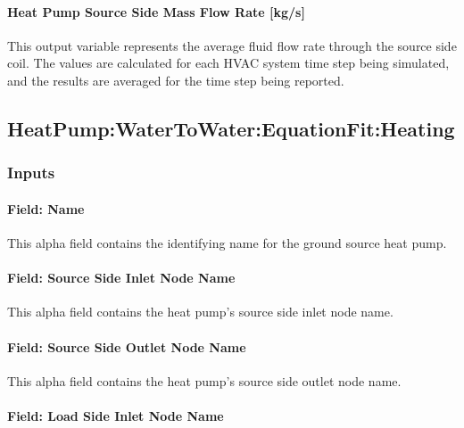 \paragraph{Heat Pump Source Side Mass Flow Rate {[}kg/s{]}}\label{water-to-water-heat-pump-source-side-mass-flow-rate-kgs}

This output variable represents the average fluid flow rate through the source side coil. The values are calculated for each HVAC system time step being simulated, and the results are averaged for the time step being reported.

\subsection{HeatPump:WaterToWater:EquationFit:Heating}\label{heatpumpwatertowaterequationfitheating}

\subsubsection{Inputs}\label{inputs-13-010}

\paragraph{Field: Name}\label{field-name-12-008}

This alpha field contains the identifying name for the ground source heat pump.

\paragraph{Field: Source Side Inlet Node Name}\label{field-source-side-inlet-node-name-1}

This alpha field contains the heat pump's source side inlet node name.

\paragraph{Field: Source Side Outlet Node Name}\label{field-source-side-outlet-node-name-1}

This alpha field contains the heat pump's source side outlet node name.

\paragraph{Field: Load Side Inlet Node Name}\label{field-load-side-inlet-node-name-1}

